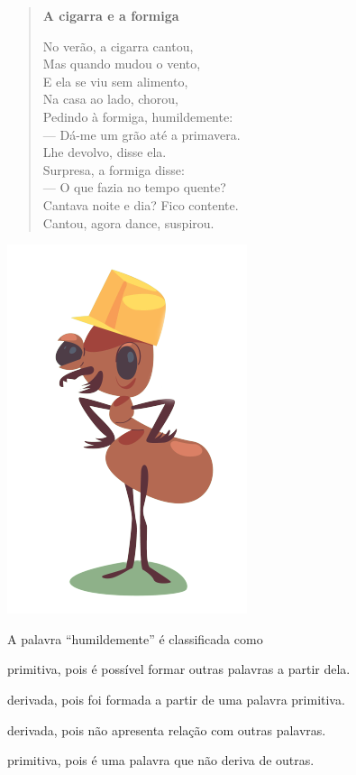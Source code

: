 \begin{myquote}
\begin{minipage}{.9\textwidth}
\begin{verse}
\textbf{A cigarra e a formiga}

No verão, a cigarra cantou,\\
Mas quando mudou o vento,\\
E ela se viu sem alimento,\\ 
Na casa ao lado, chorou,\\
Pedindo à formiga, humildemente:\\

\hspace{3em} --- Dá-me um grão até a primavera.\\
\hspace{3em} Lhe devolvo, disse ela.\\

Surpresa, a formiga disse:\\

\hspace{3em} --- O que fazia no tempo quente?\\
\hspace{3em} Cantava noite e dia? Fico contente.\\ 
\hspace{3em} Cantou, agora dance, suspirou.\\

\end{verse}
\end{minipage}
\begin{minipage}{.1\textwidth}
\end{minipage}
\includegraphics[width=.2\textwidth]{./media/image1f.png}
\end{myquote}

A palavra ``humildemente'' é classificada como

\begin{escolha}[itemsep=-5pt]
\item primitiva, pois é possível formar outras palavras a partir dela.

\item derivada, pois foi formada a partir de uma palavra primitiva.

\item derivada, pois não apresenta relação com outras palavras.

\item primitiva, pois é uma palavra que não deriva de outras.
\end{escolha}

